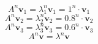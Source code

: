 
\begin{equation*}
    A^n\bm{v}_1=\lambda^n_1\bm{v}_1=1^n\cdot \bm{v}_1
\end{equation*}
\begin{equation*}
    A^n\bm{v}_2=\lambda^n_2\bm{v}_2=0.8^n\cdot \bm{v}_2
\end{equation*}
\begin{equation*}
    A^n\bm{v}_3=\lambda^n_3\bm{v}_3=0.6^n\cdot \bm{v}_3
\end{equation*}
\begin{equation*}
    A^n\bm{v}=\lambda^n\bm{v}
\end{equation*}
